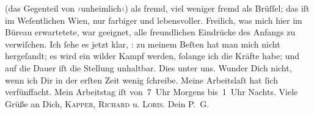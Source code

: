 \begin{ledgroupsized}[t]{13cm}
{{{                  (das Gegenteil von ›unheimlich‹)}}}\label{K_L02673-2h} als fremd, viel weniger fremd als Brüſſel; das iſt im Weſentlichen Wien, nur farbiger und lebensvoller. Freilich, was mich hier im
                  Büreau erwartetete, war
               geeignet, alle freundlichen Eindrücke des Anfangs zu verwiſchen. Ich ſehe es jetzt
               klar, \label{K_L02673-5v}\label{K_L02673-5h}: zu meinem Beſten hat man mich nicht hergeſandt; es wird ein wilder Kampf
               werden, ſolange ich die Kräfte habe; und auf die Dauer iſt die Stellung unhaltbar.
               Dies unter uns. Wunder Dich nicht, wenn ich Dir in der erſten Zeit wenig ſchreibe.
               Meine Arbeitslaſt hat ſich verfünffacht. Mein Arbeitstag iſt von 7 Uhr Morgens
               bis 1 Uhr Nachts. Viele Grüße an Dich, \textsc{Kapper}, \textsc{Richard} u. \textsc{Loris}. Dein \spacefill\mbox{P. G.}\pend
           \pstart
           \noindent{}\label{T_L02673-1v}\label{T_L02673-1h}\pend
                     \endnumbering{}\end{ledgroupsized}  \newcommand{\dateiname}{L02673}\newcommand{\titel}{Paul Goldmann an Arthur Schnitzler, 3. 12. 1891}\newcommand{\editorInnen}{Martin Anton Müller und Laura Untner}
            \footnotesize
\begin{ledgroupsized}[t]{11.5cm}
\end{ledgroupsized}
         
      